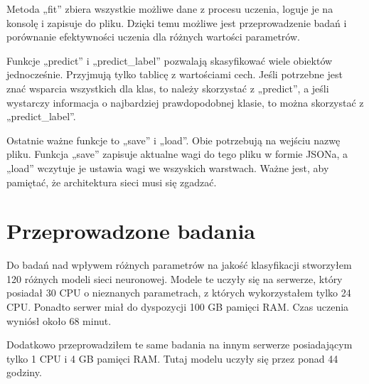 \documentclass{report}
\begin{document}
    Metoda „fit” zbiera wszystkie możliwe dane z procesu uczenia, loguje je na konsolę i zapisuje do pliku.
    Dzięki temu możliwe jest przeprowadzenie badań i porównanie efektywności uczenia dla różnych wartości parametrów.

    Funkcje „predict” i „predict\_label” pozwalają skasyfikować wiele obiektów jednocześnie.
    Przyjmują tylko tablicę z wartościami cech.
    Jeśli potrzebne jest znać wsparcia wszystkich dla klas, to należy skorzystać z „predict”, a jeśli wystarczy informacja o najbardziej prawdopodobnej klasie, to można skorzystać z „predict\_label”.

    Ostatnie ważne funkcje to „save” i „load”.
    Obie potrzebują na wejściu nazwę pliku.
    Funkcja „save” zapisuje aktualne wagi do tego pliku w formie JSONa, a „load” wczytuje je ustawia wagi we wszyskich warstwach.
    Ważne jest, aby pamiętać, że architektura sieci musi się zgadzać.

    \chapter{Przeprowadzone badania}\label{ch:przeprowadzoneBadania}

    Do badań nad wpływem różnych parametrów na jakość klasyfikacji stworzyłem 120 różnych modeli sieci neuronowej.
    Modele te uczyły się na serwerze, który posiadał 30 CPU o nieznanych parametrach, z których wykorzystałem tylko 24 CPU.
    Ponadto serwer miał do dyspozycji 100 GB pamięci RAM.
    Czas uczenia wyniósł około 68 minut.

    Dodatkowo przeprowadziłem te same badania na innym serwerze posiadającym tylko 1 CPU i 4 GB pamięci RAM.
    Tutaj modelu uczyły się przez ponad 44 godziny.
\end{document}

